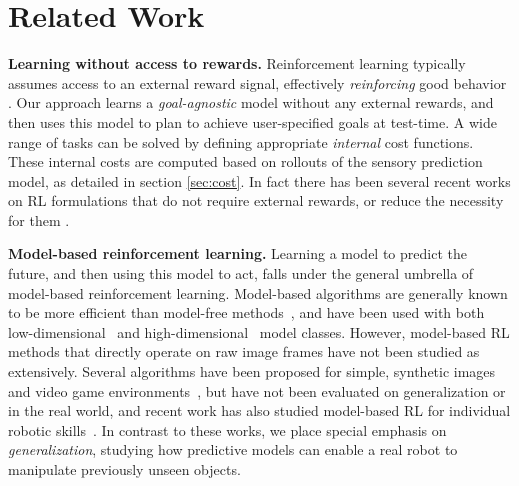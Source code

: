 \section{Related Work}\label{sec:rel_work}

\textbf{Learning without access to rewards.}
Reinforcement learning typically assumes access to an external reward signal, effectively \emph{reinforcing} good behavior \cite{lillicrap2015continuous, sutton1998reinforcement}. Our approach learns a \emph{goal-agnostic} model without any external rewards, and then uses this model to plan to achieve user-specified goals at test-time.
A wide range of tasks can be solved by defining appropriate \emph{internal} cost functions. These internal costs are computed based on rollouts of the sensory prediction model, as detailed in section \ref{sec:cost}. In fact there has been several recent works on RL formulations that do not require external rewards\cite{chentanez2005intrinsically, pathak2017curiosity}, or reduce the necessity for them \cite{andrychowicz2017hindsight}.

\noindent \textbf{Model-based reinforcement learning.} Learning a model to predict the future, and then using this model to act, falls under the general umbrella of model-based reinforcement learning. Model-based algorithms are generally known to be more efficient than model-free methods~\cite{chua2018deep, deisenroth2013survey}, and have been used with both low-dimensional~\cite{deisenroth2011pilco} and high-dimensional~\cite{nagabandi2017neural} model classes. However, model-based RL methods that directly operate on raw image frames have not been studied as extensively. Several algorithms have been proposed for simple, synthetic images~\cite{watter2015embed} and video game environments~\cite{ha2018world, atarioh}, but have not been evaluated on generalization or in the real world, and recent work has also studied model-based RL for individual robotic skills~\cite{zhang2018solar}. In contrast to these works, we place special emphasis on \emph{generalization}, studying how predictive models can enable a real robot to manipulate previously unseen objects.

